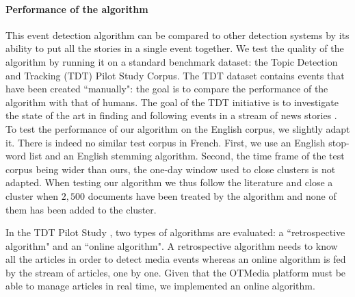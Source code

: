 \paragraph{Performance of the algorithm}

This event detection algorithm can be compared to other detection systems by its ability to put all the stories in a single event together. We test the quality of the algorithm by running it on a standard benchmark dataset: the Topic Detection and Tracking (TDT) Pilot Study Corpus. The TDT dataset contains events that have been created ``manually": the goal is to compare the performance of the algorithm with that of humans. The goal of the TDT initiative is to investigate the state of the art in finding and following events in a stream of news stories \citep[see e.g.][]{Allan1998}. To test the performance of our algorithm on the English corpus, we slightly adapt it. There is indeed no similar test corpus in French. First, we use an English stop-word list and an English stemming algorithm. Second, the time frame of the test corpus being wider than ours, the one-day window used to close clusters is not adapted. When testing our algorithm we thus follow the literature \citep{Allan2005} and close a cluster when $2,500$ documents have been treated by the algorithm and none of them has been added to the cluster.

In the TDT Pilot Study \citet{Allan1998}, two types of algorithms are evaluated: a ``retrospective algorithm" and an ``online algorithm". A retrospective algorithm needs to know all the articles in order to detect media events whereas an online algorithm is fed by the stream of articles, one by one. Given that the OTMedia platform must be able to manage articles in real time, we implemented an online algorithm. 

